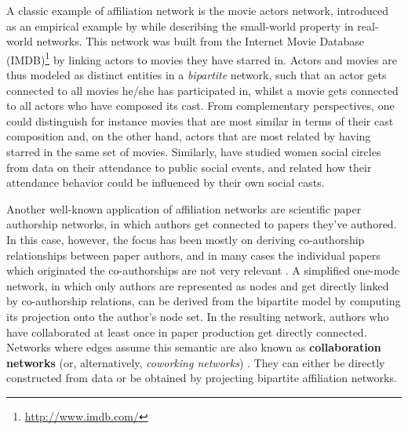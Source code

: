 A classic example of affiliation network is the movie actors network, introduced as an empirical example by  while describing the small-world property in real-world networks.
This network was built from the Internet Movie Database (IMDB)\footnote{\url{http://www.imdb.com/}} by linking actors to movies they have starred in.
Actors and movies are thus modeled as distinct entities in a \emph{bipartite} network, such that an actor gets connected to all movies he/she has participated in, whilst a movie gets connected to all actors who have composed its cast.  
From complementary perspectives, one could distinguish for instance movies that are most similar in terms of their cast composition and, on the other hand, actors that are most related by having starred in the same set of movies.
%
Similarly,  have studied women social circles from data on their attendance to public social events, and related how their attendance behavior could be influenced by their own social casts. 

Another well-known application of affiliation networks are scientific paper authorship networks, in which authors get connected to papers they've authored.
In this case, however, the focus has been mostly on deriving co-authorship relationships between paper authors, and in many cases the individual papers which originated the co-authorships are not very relevant \cite{Newman2004, Borrett2014}.
A simplified one-mode network, in which only authors are represented as nodes and get directly linked by co-authorship relations, can be derived from the bipartite model by computing its projection onto the author's node set.
In the resulting network, authors who have collaborated at least once in paper production get directly connected.
Networks where edges assume this semantic are also known as \textbf{collaboration networks} (or, alternatively, \textit{coworking networks}) \cite{Ramasco2004}.
They can either be directly constructed from data or be obtained by projecting bipartite affiliation networks.

